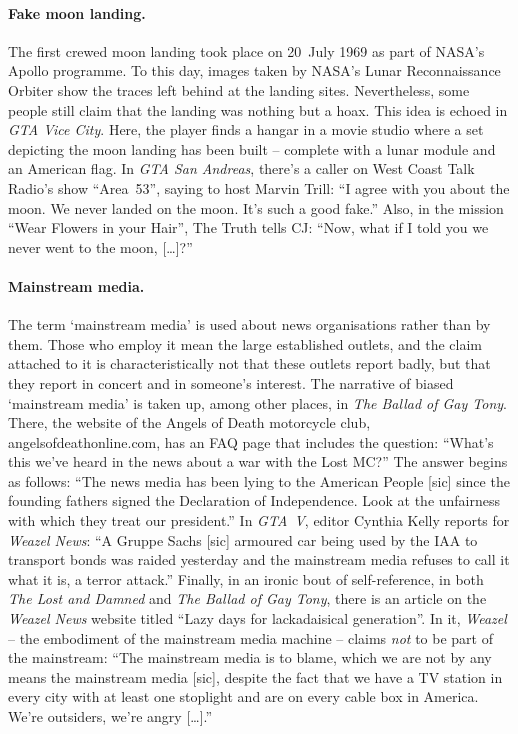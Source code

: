 \documentclass[]{scrartcl}
\begin{document}
\paragraph{Fake moon landing.}
The first crewed moon landing took place on 20~July 1969 as part of NASA's Apollo programme.
To this day, images taken by NASA's Lunar Reconnaissance Orbiter show the traces left behind at the landing sites.
Nevertheless, some people still claim that the landing was nothing but a hoax.
This idea is echoed in \textit{GTA Vice City}.
Here, the player finds a hangar in a movie studio where a set depicting the moon landing has been built -- complete with a lunar module and an American flag.
In \textit{GTA San Andreas}, there's a caller on West Coast Talk Radio's show \enquote{Area~53}, saying to host Marvin Trill:
\enquote{I agree with you about the moon.
We never landed on the moon.
It's such a good fake.}
Also, in the mission \enquote{Wear Flowers in your Hair}, The Truth tells CJ:
\enquote{Now, what if I told you we never went to the moon, [\dots]?}

\paragraph{Mainstream media.}
The term \enquote*{mainstream media} is used about news organisations rather than by them.
Those who employ it mean the large established outlets, and the claim attached to it is characteristically not that these outlets report badly, but that they report in concert and in someone's interest.
The narrative of biased \enquote*{mainstream media} is taken up, among other places, in \textit{The Ballad of Gay Tony}.
There, the website of the Angels of Death motorcycle club, angelsofdeathonline.com, has an FAQ page that includes the question:
\enquote{What's this we've heard in the news about a war with the Lost MC?}
The answer begins as follows:
\enquote{The news media has been lying to the American People [sic] since the founding fathers signed the Declaration of Independence.
Look at the unfairness with which they treat our president.}
In \textit{GTA~V}, editor Cynthia Kelly reports for \textit{Weazel News}:
\enquote{A Gruppe Sachs [sic] armoured car being used by the IAA to transport bonds was raided yesterday and the mainstream media refuses to call it what it is, a terror attack.}
Finally, in an ironic bout of self-reference, in both \textit{The Lost and Damned} and \textit{The Ballad of Gay Tony}, there is an article on the \textit{Weazel News} website titled \enquote{Lazy days for lackadaisical generation}.
In it, \textit{Weazel} -- the embodiment of the mainstream media machine -- claims \textit{not} to be part of the mainstream:
\enquote{The mainstream media is to blame, which we are not by any means the mainstream media [sic], despite the fact that we have a TV station in every city with at least one stoplight and are on every cable box in America.
We're outsiders, we're angry [\dots].}
\end{document}
